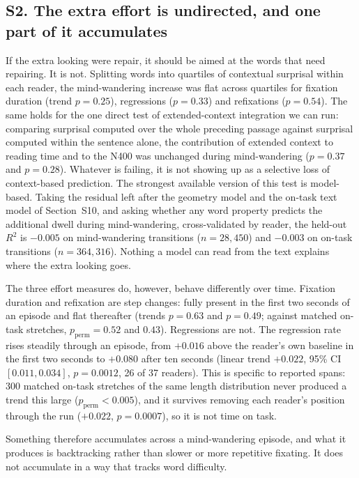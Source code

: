 \documentclass[11pt]{article}
\begin{document}
\subsection*{S2. The extra effort is undirected, and one part of it accumulates}

If the extra looking were repair, it should be aimed at the words that need repairing. It is
not. Splitting words into quartiles of contextual surprisal within each reader, the
mind-wandering increase was flat across quartiles for fixation duration (trend $p=0.25$),
regressions ($p=0.33$) and refixations ($p=0.54$). The same holds for the one direct test of
extended-context integration we can run: comparing surprisal computed over the whole preceding
passage against surprisal computed within the sentence alone, the contribution of extended
context to reading time and to the N400 was unchanged during mind-wandering ($p=0.37$ and
$p=0.28$). Whatever is failing, it is not showing up as a selective loss of context-based
prediction. The strongest available version of this test is model-based. Taking the
residual left after the geometry model and the on-task text model of Section~S10, and asking
whether any word property predicts the additional dwell during mind-wandering, cross-validated
by reader, the held-out $R^2$ is $-0.005$ on mind-wandering transitions ($n=28{,}450$) and
$-0.003$ on on-task transitions ($n=364{,}316$). Nothing a model can read from the text explains
where the extra looking goes.

The three effort measures do, however, behave differently over time. Fixation duration and
refixation are step changes: fully present in the first two seconds of an episode and flat
thereafter (trends $p=0.63$ and $p=0.49$; against matched on-task stretches, $p_{\text{perm}}
=0.52$ and $0.43$). Regressions are not. The regression rate rises steadily through an episode,
from $+0.016$ above the reader's own baseline in the first two seconds to $+0.080$ after ten
seconds (linear trend $+0.022$, 95\% CI $[0.011, 0.034]$, $p=0.0012$, 26 of 37 readers). This
is specific to reported spans: 300 matched on-task stretches of the same length distribution
never produced a trend this large ($p_{\text{perm}}<0.005$), and it survives removing each
reader's position through the run ($+0.022$, $p=0.0007$), so it is not time on task.

Something therefore accumulates across a mind-wandering episode, and what it produces is
backtracking rather than slower or more repetitive fixating. It does not accumulate in a way
that tracks word difficulty.
\end{document}
